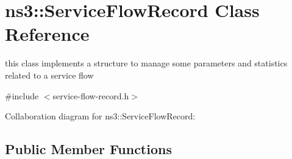 \hypertarget{classns3_1_1ServiceFlowRecord}{}\section{ns3\+:\+:Service\+Flow\+Record Class Reference}
\label{classns3_1_1ServiceFlowRecord}


this class implements a structure to manage some parameters and statistics related to a service flow  




{\ttfamily \#include $<$service-\/flow-\/record.\+h$>$}



Collaboration diagram for ns3\+:\+:Service\+Flow\+Record\+:
\subsection*{Public Member Functions}
